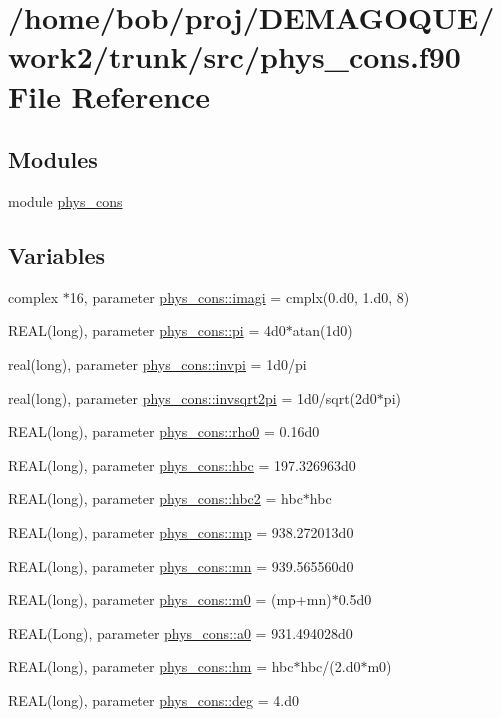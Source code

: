 \hypertarget{phys__cons_8f90}{
\section{/home/bob/proj/DEMAGOQUE/work2/trunk/src/phys\_\-cons.f90 File Reference}
\label{phys__cons_8f90}
}
\subsection*{Modules}
\begin{DoxyCompactItemize}
\item 
module \hyperlink{namespacephys__cons}{phys\_\-cons}
\end{DoxyCompactItemize}
\subsection*{Variables}
\begin{DoxyCompactItemize}
\item 
complex $\ast$16, parameter \hyperlink{namespacephys__cons_a0dbb22856790b16e206de451e9cdd74a}{phys\_\-cons::imagi} = cmplx(0.d0, 1.d0, 8)
\item 
REAL(long), parameter \hyperlink{namespacephys__cons_aae3c6cb8ae765b0262bb110ff739ba9d}{phys\_\-cons::pi} = 4d0$\ast$atan(1d0)
\item 
real(long), parameter \hyperlink{namespacephys__cons_aa8683f00f4216acc1822dfcb85b1ee00}{phys\_\-cons::invpi} = 1d0/pi
\item 
real(long), parameter \hyperlink{namespacephys__cons_a369d33713444a99a71f80a74c0652d4e}{phys\_\-cons::invsqrt2pi} = 1d0/sqrt(2d0$\ast$pi)
\item 
REAL(long), parameter \hyperlink{namespacephys__cons_a4b10513970a98ad78b85723c60d9a8b6}{phys\_\-cons::rho0} = 0.16d0
\item 
REAL(long), parameter \hyperlink{namespacephys__cons_a3f47589553abc71257ab3e88ef7bbb39}{phys\_\-cons::hbc} = 197.326963d0
\item 
REAL(long), parameter \hyperlink{namespacephys__cons_af78d210174277076bb64ff4403f8c9fd}{phys\_\-cons::hbc2} = hbc$\ast$hbc
\item 
REAL(long), parameter \hyperlink{namespacephys__cons_ae2a4cb4e421fe399f19d0729b5617fed}{phys\_\-cons::mp} = 938.272013d0
\item 
REAL(long), parameter \hyperlink{namespacephys__cons_ad68aaba74b75e1e13f1367c1eb0904c1}{phys\_\-cons::mn} = 939.565560d0
\item 
REAL(long), parameter \hyperlink{namespacephys__cons_a2e392d52d36b5c1db0d17928aa40f35b}{phys\_\-cons::m0} = (mp+mn)$\ast$0.5d0
\item 
REAL(Long), parameter \hyperlink{namespacephys__cons_a02e8bb2c808e0085a317bf36ff79ae2a}{phys\_\-cons::a0} = 931.494028d0
\item 
REAL(long), parameter \hyperlink{namespacephys__cons_ad97ad749ef4f8f66c56a0facb7394cb5}{phys\_\-cons::hm} = hbc$\ast$hbc/(2.d0$\ast$m0)
\item 
REAL(long), parameter \hyperlink{namespacephys__cons_a553e3e17652770308e6bffcb8fcb5a95}{phys\_\-cons::deg} = 4.d0
\end{DoxyCompactItemize}
